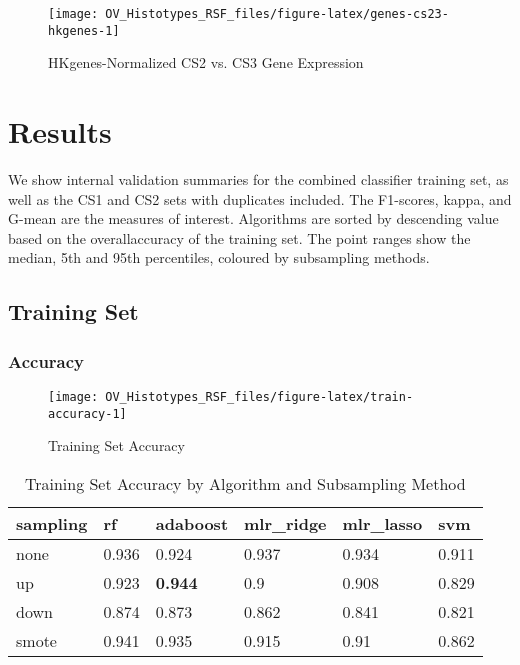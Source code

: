 \documentclass[
]{report}
\begin{document}
\begin{figure}[H]

{\centering \texttt{[image: OV\_Histotypes\_RSF\_files/figure-latex/genes-cs23-hkgenes-1]} 

}

\caption{HKgenes-Normalized CS2 vs. CS3 Gene Expression}\label{fig:genes-cs23-hkgenes}
\end{figure}

\hypertarget{results}{%
\chapter{Results}\label{results}}

We show internal validation summaries for the combined classifier training set, as well as the CS1 and CS2 sets with duplicates included. The F1-scores, kappa, and G-mean are the measures of interest. Algorithms are sorted by descending value based on the overallaccuracy of the training set. The point ranges show the median, 5th and 95th percentiles, coloured by subsampling methods.

\hypertarget{training-set}{%
\section{Training Set}\label{training-set}}

\hypertarget{accuracy}{%
\subsection{Accuracy}\label{accuracy}}

\begin{figure}[H]

{\centering \texttt{[image: OV\_Histotypes\_RSF\_files/figure-latex/train-accuracy-1]} 

}

\caption{Training Set Accuracy}\label{fig:train-accuracy}
\end{figure}

\begin{table}

\caption{\label{tab:train-accuracy-table}Training Set Accuracy by Algorithm and Subsampling Method}
\centering
\begin{tabular}[t]{l|l|l|l|l|l}
\hline
sampling & rf & adaboost & mlr\_ridge & mlr\_lasso & svm\\
\hline
none & 0.936 & 0.924 & 0.937 & 0.934 & 0.911\\
\hline
up & 0.923 & \textbf{0.944} & 0.9 & 0.908 & 0.829\\
\hline
down & 0.874 & 0.873 & 0.862 & 0.841 & 0.821\\
\hline
smote & 0.941 & 0.935 & 0.915 & 0.91 & 0.862\\
\hline
\end{tabular}
\end{table}
\end{document}
